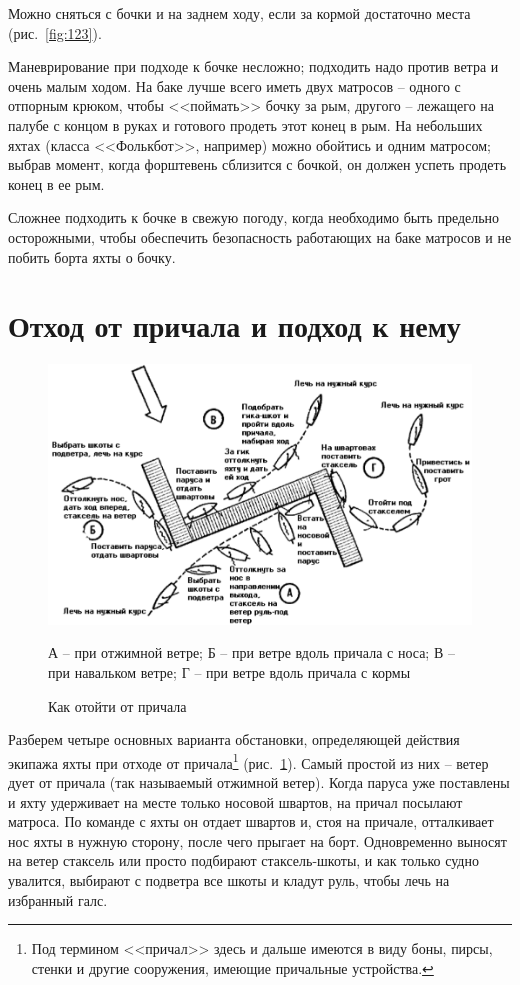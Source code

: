\documentclass[a4paper, 12pt, twoside, final]{scrbook}
\begin{document}
Можно сняться с бочки и на заднем ходу, если за кормой достаточно места (рис.~\ref{fig:123}).

Маневрирование при подходе к бочке несложно; подходить надо против ветра и очень малым ходом. На баке лучше всего иметь двух матросов \--- одного с отпорным крюком, чтобы <<поймать>> бочку за рым, другого \--- лежащего на палубе с концом в руках и готового продеть этот конец в рым. На небольших яхтах (класса <<Фолькбот>>, например) можно обойтись и одним матросом; выбрав момент, когда форштевень сблизится с бочкой, он должен успеть продеть конец в ее рым.

Сложнее подходить к бочке в свежую погоду, когда необходимо быть предельно осторожными, чтобы обеспечить безопасность работающих на баке матросов и не побить борта яхты о бочку.

\section{Отход от причала и подход к нему}

\begin{figure}[htbp]
   \centering
   \includegraphics{pics/124_Kak_ot_prichala} %
   \caption{Как отойти от причала}
   \label{fig:124}
   \centering\small
   А \--- при отжимной ветре; Б \--- при ветре вдоль причала с носа; В \--- при навальком ветре; Г \--- при ветре вдоль причала с кормы
\end{figure}

Разберем четыре основных варианта обстановки, определяющей действия экипажа яхты при отходе от причала\footnote{Под термином <<причал>> здесь и дальше имеются в виду боны, пирсы, стенки и другие сооружения, имеющие причальные устройства.} (рис.~\ref{fig:124}). Самый простой из них \--- ветер дует от причала (так называемый отжимной ветер). Когда паруса уже поставлены и яхту удерживает на месте только носовой швартов, на причал посылают матроса. По команде с яхты он отдает швартов и, стоя на причале, отталкивает нос яхты в нужную сторону, после чего прыгает на борт. Одновременно выносят на ветер стаксель или просто подбирают стаксель-шкоты, и как только судно увалится, выбирают с подветра все шкоты и кладут руль, чтобы лечь на избранный галс. 
\end{document}
